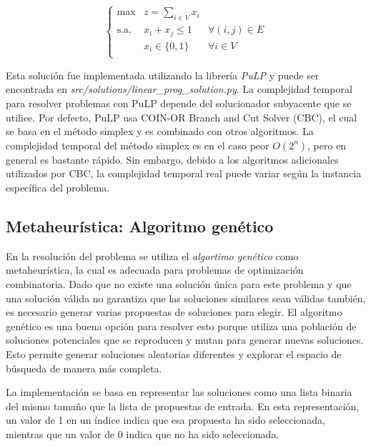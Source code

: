 \documentclass[10pt]{article} %
\begin{document}
	\begin{equation} \left\{
		\begin{matrix}
			\max & \displaystyle z=\sum_{i \in V}x_{i}\\
			\textrm{s.a.} & x_i + x_j \leq 1 & \forall (i, j) \in E \\
			& x_i \in \{0, 1\} & \forall i \in V \\ 
		\end{matrix} \right. 
	\end{equation} 
	
	Esta soluci\'on fue implementada utilizando la librer\'ia \textit{PuLP} y puede ser encontrada en \textit{src/solutions/linear\_prog\_solution.py}. La complejidad temporal para resolver problemas con PuLP depende del solucionador subyacente que se utilice. Por defecto, PuLP usa COIN-OR Branch and Cut Solver (CBC), el cual se basa en el método simplex y es combinado con otros algoritmos. La complejidad temporal del método simplex es en el caso peor $O(2^{n})$, pero en general es bastante r\'apido. Sin embargo, debido a los algoritmos adicionales utilizados por CBC, la complejidad temporal real puede variar según la instancia específica del problema.
	
	
	\subsection{Metaheur\'istica: Algoritmo gen\'etico}
	
	En la resoluci\'on del problema se utiliza el \textit{algortimo gen\'etico} como metaheur\'istica, la cual es adecuada para problemas de optimización combinatoria.   Dado que no existe una solución única para este problema y que una solución válida no garantiza que las soluciones similares sean válidas también, es necesario generar varias propuestas de soluciones para elegir. El algoritmo genético es una buena opción para resolver esto porque utiliza una población de soluciones potenciales que se reproducen y mutan para generar nuevas soluciones. Esto permite generar soluciones aleatorias diferentes y explorar el espacio de b\'usqueda de manera más completa.
	
	La implementación se basa en representar las soluciones como una lista binaria del mismo tamaño que la lista de propuestas de entrada. En esta representación, un valor de 1 en un índice indica que esa propuesta ha sido seleccionada, mientras que un valor de 0 indica que no ha sido seleccionada.
	
\end{document}
